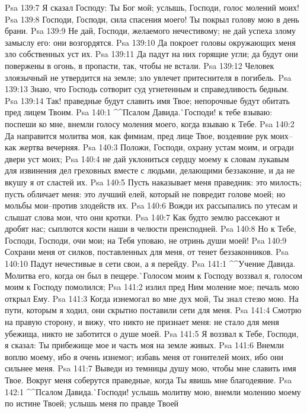 Psa 139:7  Я сказал Господу: Ты Бог мой; услышь, Господи, голос молений моих!
Psa 139:8  Господи, Господи, сила спасения моего! Ты покрыл голову мою в день брани.
Psa 139:9  Не дай, Господи, желаемого нечестивому; не дай успеха злому замыслу его: они возгордятся.
Psa 139:10  Да покроет головы окружающих меня зло собственных уст их.
Psa 139:11  Да падут на них горящие угли; да будут они повержены в огонь, в пропасти, так, чтобы не встали.
Psa 139:12  Человек злоязычный не утвердится на земле; зло увлечет притеснителя в погибель.
Psa 139:13  Знаю, что Господь сотворит суд угнетенным и справедливость бедным.
Psa 139:14  Так! праведные будут славить имя Твое; непорочные будут обитать пред лицем Твоим.
Psa 140:1  ^^Псалом Давида.^^ Господи! к тебе взываю: поспеши ко мне, внемли голосу моления моего, когда взываю к Тебе.
Psa 140:2  Да направится молитва моя, как фимиам, пред лице Твое, воздеяние рук моих--как жертва вечерняя.
Psa 140:3  Положи, Господи, охрану устам моим, и огради двери уст моих;
Psa 140:4  не дай уклониться сердцу моему к словам лукавым для извинения дел греховных вместе с людьми, делающими беззаконие, и да не вкушу я от сластей их.
Psa 140:5  Пусть наказывает меня праведник: это милость; пусть обличает меня: это лучший елей, который не повредит голове моей; но мольбы мои--против злодейств их.
Psa 140:6  Вожди их рассыпались по утесам и слышат слова мои, что они кротки.
Psa 140:7  Как будто землю рассекают и дробят нас; сыплются кости наши в челюсти преисподней.
Psa 140:8  Но к Тебе, Господи, Господи, очи мои; на Тебя уповаю, не отринь души моей!
Psa 140:9  Сохрани меня от силков, поставленных для меня, от тенет беззаконников.
Psa 140:10  Падут нечестивые в сети свои, а я перейду.
Psa 141:1  ^^Учение Давида. Молитва его, когда он был в пещере.^^ Голосом моим к Господу воззвал я, голосом моим к Господу помолился;
Psa 141:2  излил пред Ним моление мое; печаль мою открыл Ему.
Psa 141:3  Когда изнемогал во мне дух мой, Ты знал стезю мою. На пути, которым я ходил, они скрытно поставили сети для меня.
Psa 141:4  Смотрю на правую сторону, и вижу, что никто не признает меня: не стало для меня убежища, никто не заботится о душе моей.
Psa 141:5  Я воззвал к Тебе, Господи, я сказал: Ты прибежище мое и часть моя на земле живых.
Psa 141:6  Внемли воплю моему, ибо я очень изнемог; избавь меня от гонителей моих, ибо они сильнее меня.
Psa 141:7  Выведи из темницы душу мою, чтобы мне славить имя Твое. Вокруг меня соберутся праведные, когда Ты явишь мне благодеяние.
Psa 142:1  ^^Псалом Давида.^^ Господи! услышь молитву мою, внемли молению моему по истине Твоей; услышь меня по правде Твоей
